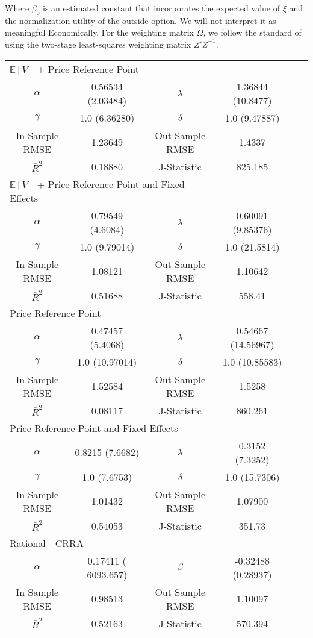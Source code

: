 \documentclass[12pt]{paper}
\newcommand{\inv}[1]{{#1}^{-1}}
\newcommand{\exV}[1]{\mathbb{E} \left [ #1 \right ]}
\begin{document}
Where $\beta_0$ is an estimated constant that incorporates the expected
value of $\xi$ and the normalization utility of the outside option. We
will not interpret it as meaningful Economically. For the weighting
matrix $\Omega$, we follow the standard of using the two-stage
least-squares weighting matrix $\inv{Z'Z}$. 




\begin{minipage}{\linewidth}
  \centering
\begin{tabular}{@{}cccccc@{}}\toprule
  \multicolumn{3}{l}{$\exV{V}$ + Price Reference Point} & &\\
$\alpha$ & 0.56534 (2.03484) & $\lambda$ & 1.36844 (10.8477)\\
$\gamma$ & 1.0 (6.36280) & $\delta$ & 1.0 (9.47887)\\
  In Sample RMSE & 1.23649 & Out Sample RMSE & 1.4337\\
  $\bar{R}^2$ & 0.18880 & J-Statistic & 825.185\\
  \midrule
 \multicolumn{3}{l}{$\exV{V}$ + Price Reference Point and Fixed
  Effects} & &\\
$\alpha$ & 0.79549 (4.6084) & $\lambda$ & 0.60091 (9.85376)\\
$\gamma$ & 1.0 (9.79014) & $\delta$ & 1.0 (21.5814)\\
  In Sample RMSE & 1.08121 & Out Sample RMSE & 1.10642\\
  $\bar{R}^2$ & 0.51688 & J-Statistic & 558.41\\
  \midrule
\multicolumn{3}{l}{Price Reference Point} & &\\
$\alpha$ & 0.47457 (5.4068) & $\lambda$ & 0.54667 (14.56967)\\
$\gamma$ & 1.0 (10.97014) & $\delta$ & 1.0 (10.85583)\\
  In Sample RMSE & 1.52584 & Out Sample RMSE & 1.5258\\
  $\bar{R}^2$ & 0.08117 & J-Statistic & 860.261\\
  \midrule
\multicolumn{3}{l}{Price Reference Point and Fixed Effects} & &\\
$\alpha$ & 0.8215 (7.6682) & $\lambda$ & 0.3152 (7.3252)\\
$\gamma$ & 1.0 (7.6753) & $\delta$ & 1.0 (15.7306)\\
  In Sample RMSE & 1.01432 & Out Sample RMSE & 1.07900\\
  $\bar{R}^2$ & 0.54053 & J-Statistic & 351.73\\
  \midrule
\multicolumn{3}{l}{Rational - CRRA} & &\\
$\alpha$ & 0.17411 ( 6093.657) & $\beta$ & -0.32488 (0.28937)\\
  In Sample RMSE & 0.98513 & Out Sample RMSE & 1.10097\\
  $\bar{R}^2$ & 0.52163 & J-Statistic & 570.394\\\bottomrule
\end{tabular}
\end{minipage}
\end{document}
